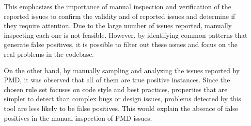 This emphasizes the importance of manual inspection and verification of the reported issues to confirm the validity and of reported issues and determine if they require attention. Due to the large number of issues reported, manually inspecting each one is not feasible. However, by identifying common patterns that generate false positives, it is possible to filter out these issues and focus on the real problems in the codebase.

On the other hand, by manually sampling and analyzing the issues reported by PMD, it was observed that all of them are true positive instances. Since the chosen rule set focuses on code style and best practices, properties that are simpler to detect than complex bugs or design issues, problems detected by this tool are less likely to be false positives. This would explain the absence of false positives in the manual inspection of PMD issues.

